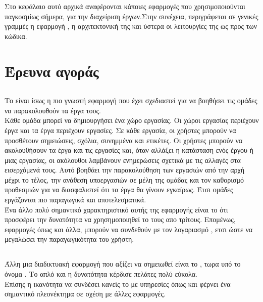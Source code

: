 Στο κεφάλαιο αυτό αρχικά αναφέρονται κάποιες εφαρμογές που χρησιμοποιούνται παγκοσμίως σήμερα, για την διαχείριση έργων.Στην συνέχεια, περιγράφεται σε γενικές γραμμές η εφαρμογή , η αρχιτεκτονική της και ύστερα οι λειτουργίες της ως προς των κώδικα.

\section{Έρευνα αγοράς}

\subsection{}
\quad Το  είναι ίσως η πιο γνωστή εφαρμογή που έχει σχεδιαστεί για να βοηθήσει τις ομάδες να παρακολουθούν τα έργα τους.\\
\pSpace Κάθε ομάδα μπορεί να δημιουργήσει ένα χώρο εργασίας. Οι χώροι εργασίας περιέχουν έργα και τα έργα περιέχουν εργασίες. Σε κάθε εργασία, οι χρήστες μπορούν να προσθέτουν σημειώσεις, σχόλια, συνημμένα και ετικέτες. Οι χρήστες μπορούν να ακολουθήσουν τα έργα και τις εργασίες και, όταν αλλάξει η κατάσταση ενός έργου ή μιας εργασίας, οι ακόλουθοι λαμβάνουν ενημερώσεις σχετικά με τις αλλαγές στα εισερχόμενά τους.  Αυτό βοηθάει την παρακολούθηση των εργασιών από την αρχή μέχρι το τέλος, την ανάθεση υποεργασιών σε μέλη της ομάδας και τον καθορισμό προθεσμιών για να διασφαλιστεί ότι τα έργα θα γίνουν εγκαίρως. Έτσι ομάδες εργάζονται πιο παραγωγικά και αποτελεσματικά. \\
\pSpace Ένα άλλο πολύ σημαντικό χαρακτηριστικό αυτής της εφαρμογής είναι το ότι προσφέρει την δυνατότητα να χρησημοποιηθεί το  τους απο τρίτους. Επομένως, εφαρμογές όπως  και άλλα, μπορούν να συνδεθούν με τον λογαριασμό , ετσι ώστε να μεγαλώσει την παραγωγικότητα του χρήστη.

\subsection{}
\pSpace Άλλη μια διαδικτυακή εφαρμογή που αξίζει να σημειωθεί είναι το , τωρα υπό το όνομα . Το απλό  και η δυνατότητα  κέρδισε πελάτες πολύ εύκολα.\\
\pSpace Επίσης η ικανότητα να συνδέσει κανείς το  με υπηρεσίες όπως  και  φέρνει ένα σημαντικό πλεονέκτημα σε σχέση με άλλες εφαρμογές. 

